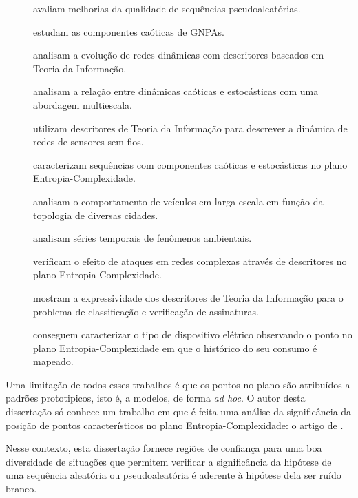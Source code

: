 \begin{description}
\item[\citet{De_Micco_2008}] avaliam melhorias da qualidade de sequências pseudoaleatórias.
\item[\citet{De_Micco_2009}] estudam as componentes caóticas de GNPAs.
\item[\citet{ComplexNetworksEvolution}] analisam a evolução de redes dinâmicas com descritores baseados em Teoria da Informação.
\item[\citet{DistinguishingChaoticStochasticDynamicsTimeSeriesMultiscaleSymbolicApproach}] analisam a relação entre dinâmicas caóticas e estocásticas com uma abordagem multiescala.
\item[\citet{StructuralChangesDataCommunicationWSN}] utilizam descritores de Teoria da Informação para descrever a dinâmica de redes de sensores sem fios.
\item[\citet{DistinguishingNoiseFromChaos}] caracterizam sequências com componentes caóticas e estocásticas no plano Entropia-Complexidade.
\item[\citet{CharacterizationVehicleBehaviorInformationTheory}] analisam o comportamento de veículos em larga escala em função da topologia de diversas cidades.
\item[\citet{DiagnosingDynamicsObservedSimulatedEcosystem}] analisam séries temporais de fenômenos ambientais.
\item[\citet{InformationTheoryPerspectiveNetworkRobustness}] verificam o efeito de ataques em redes complexas através de descritores no plano Entropia-Complexidade.
\item[\citet{ClassificationVerificationOnlineHandwrittenSignatures}] mostram a expressividade dos descritores de Teoria da Informação para o problema de classificação e verificação de assinaturas.
\item[\citet{CharacterizationElectricLoadInformationTheoryQuantifiers}] conseguem caracterizar o tipo de dispositivo elétrico observando o ponto no plano Entropia-Complexidade em que o histórico do seu consumo é mapeado.
\end{description}

Uma limitação de todos esses trabalhos é que os pontos no plano são atribuídos a padrões prototipicos, isto é, a modelos, de forma \textit{ad hoc}.
O autor desta dissertação só conhece um trabalho em que é feita uma análise da significância da posição de pontos característicos no plano Entropia-Complexidade: o artigo de \citet{NewPermutationEntropy}.

Nesse contexto, esta dissertação fornece regiões de confiança para uma boa diversidade de situações que permitem verificar a significância da hipótese de uma sequência aleatória ou pseudoaleatória é aderente à hipótese dela ser ruído branco.

